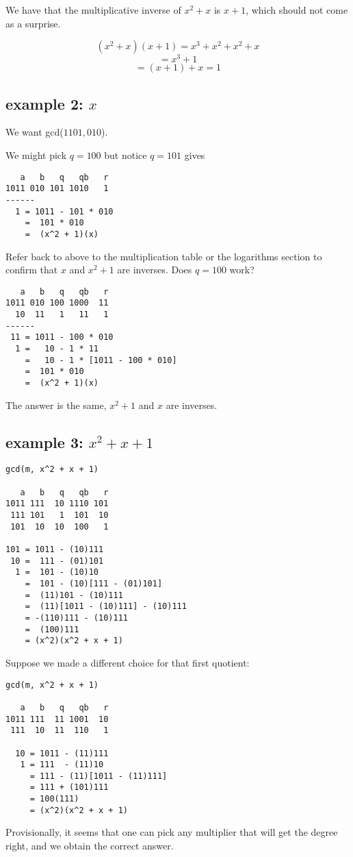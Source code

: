 \documentclass[11pt, oneside]{article}
\begin{document}
We have that the multiplicative inverse of $x^2 + x$ is $x + 1$, which should not come as a surprise.

\[ (x^2 + x)(x + 1) = x^3 + x^2 + x^2 + x \]
\[ = x^3 + 1 \]
\[ = (x + 1) + x = 1 \]

\subsection*{example 2: $x$}
We want gcd($1101, 010$).  

We might pick $q = 100$ but notice $q = 101$ gives
\begin{verbatim}
   a   b   q   qb   r
1011 010 101 1010   1
------
  1 = 1011 - 101 * 010
    =  101 * 010
    =  (x^2 + 1)(x)
\end{verbatim}

Refer back to above to the multiplication table or the logarithms section to confirm that $x$ and $x^2 + 1$ are inverses.  Does $q = 100$ work?

\begin{verbatim}
   a   b   q   qb   r
1011 010 100 1000  11
  10  11   1   11   1
------
 11 = 1011 - 100 * 010
  1 =   10 - 1 * 11
    =   10 - 1 * [1011 - 100 * 010]
    =  101 * 010
    =  (x^2 + 1)(x)
\end{verbatim}

The answer is the same, $x^2 + 1$ and $x$ are inverses.

\subsection*{example 3: $x^2 + x + 1$}

\begin{verbatim}
gcd(m, x^2 + x + 1)

   a   b   q   qb   r
1011 111  10 1110 101
 111 101   1  101  10
 101  10  10  100   1

101 = 1011 - (10)111
 10 =  111 - (01)101
  1 =  101 - (10)10
    =  101 - (10)[111 - (01)101]
    =  (11)101 - (10)111
    =  (11)[1011 - (10)111] - (10)111
    = -(110)111 - (10)111
    =  (100)111
    = (x^2)(x^2 + x + 1)
\end{verbatim}

Suppose we made a different choice for that first quotient:

\begin{verbatim}
gcd(m, x^2 + x + 1)

   a   b   q   qb   r
1011 111  11 1001  10
 111  10  11  110   1

  10 = 1011 - (11)111
   1 = 111  - (11)10
     = 111 - (11)[1011 - (11)111]
     = 111 + (101)111 
     = 100(111)
     = (x^2)(x^2 + x + 1)
\end{verbatim}

Provisionally, it seems that one can pick any multiplier that will get the degree right, and we obtain the correct answer.
\end{document}
